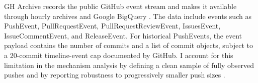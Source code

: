 GH Archive records the public GitHub event stream and makes it available through hourly archives and Google BigQuery \citep{gharchive}. The data include events such as PushEvent, PullRequestEvent, PullRequestReviewEvent, IssuesEvent, IssueCommentEvent, and ReleaseEvent. For historical PushEvents, the event payload contains the number of commits and a list of commit objects, subject to a 20-commit timeline-event cap documented by GitHub. I account for this limitation in the mechanism analysis by defining a clean sample of fully observed pushes and by reporting robustness to progressively smaller push sizes \citep{githubevents}.
